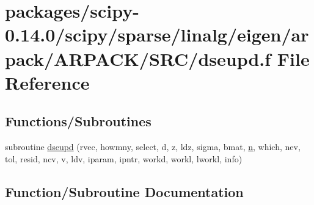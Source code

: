 \hypertarget{dseupd_8f}{}\section{packages/scipy-\/0.14.0/scipy/sparse/linalg/eigen/arpack/\+A\+R\+P\+A\+C\+K/\+S\+R\+C/dseupd.f File Reference}
\label{dseupd_8f}
\subsection*{Functions/\+Subroutines}
\begin{DoxyCompactItemize}
\item 
subroutine \hyperlink{dseupd_8f_a1e91fdc79abb5618899bcc8e6238fd62}{dseupd} (rvec, howmny, select, d, z, ldz, sigma, bmat, \hyperlink{indexexpr_8h_ab427e2e2b4d6cec55fa088ea2a692ace}{n}, which, nev, tol, resid, ncv, v, ldv, iparam, ipntr, workd, workl, lworkl, info)
\end{DoxyCompactItemize}


\subsection{Function/\+Subroutine Documentation}
\hypertarget{dseupd_8f_a1e91fdc79abb5618899bcc8e6238fd62}{}
